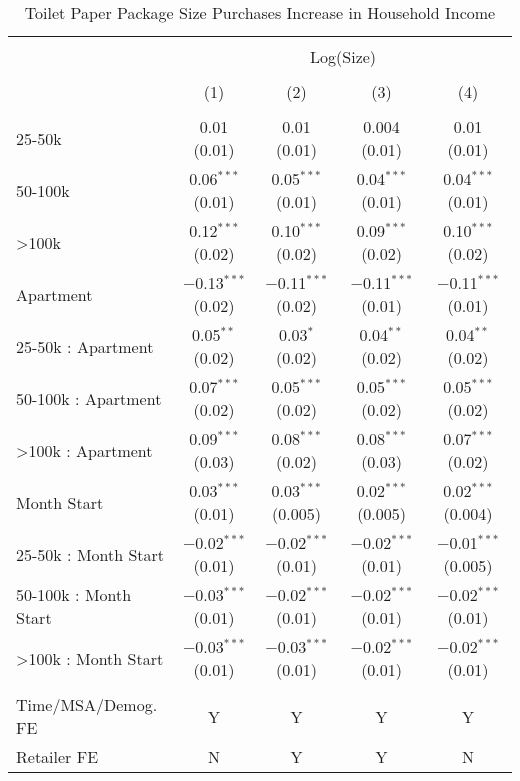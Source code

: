 
\begin{table}[!htbp] \centering 
  \caption{Toilet Paper Package Size Purchases Increase in Household Income} 
  \label{tab:packageSizeFullTP} 
\begin{tabular}{@{\extracolsep{5pt}}lcccc} 
\\[-1.8ex]\hline 
\hline \\[-1.8ex] 
 & \multicolumn{4}{c}{Log(Size)} \\ 
\\[-1.8ex] & (1) & (2) & (3) & (4)\\ 
\hline \\[-1.8ex] 
 25-50k & 0.01 (0.01) & 0.01 (0.01) & 0.004 (0.01) & 0.01 (0.01) \\ 
  50-100k & 0.06$^{***}$ (0.01) & 0.05$^{***}$ (0.01) & 0.04$^{***}$ (0.01) & 0.04$^{***}$ (0.01) \\ 
  >100k & 0.12$^{***}$ (0.02) & 0.10$^{***}$ (0.02) & 0.09$^{***}$ (0.02) & 0.10$^{***}$ (0.02) \\ 
  Apartment & $-$0.13$^{***}$ (0.02) & $-$0.11$^{***}$ (0.02) & $-$0.11$^{***}$ (0.01) & $-$0.11$^{***}$ (0.01) \\ 
  25-50k : Apartment & 0.05$^{**}$ (0.02) & 0.03$^{*}$ (0.02) & 0.04$^{**}$ (0.02) & 0.04$^{**}$ (0.02) \\ 
  50-100k : Apartment & 0.07$^{***}$ (0.02) & 0.05$^{***}$ (0.02) & 0.05$^{***}$ (0.02) & 0.05$^{***}$ (0.02) \\ 
  >100k : Apartment & 0.09$^{***}$ (0.03) & 0.08$^{***}$ (0.02) & 0.08$^{***}$ (0.03) & 0.07$^{***}$ (0.02) \\ 
  Month Start & 0.03$^{***}$ (0.01) & 0.03$^{***}$ (0.005) & 0.02$^{***}$ (0.005) & 0.02$^{***}$ (0.004) \\ 
  25-50k : Month Start & $-$0.02$^{***}$ (0.01) & $-$0.02$^{***}$ (0.01) & $-$0.02$^{***}$ (0.01) & $-$0.01$^{***}$ (0.005) \\ 
  50-100k : Month Start & $-$0.03$^{***}$ (0.01) & $-$0.02$^{***}$ (0.01) & $-$0.02$^{***}$ (0.01) & $-$0.02$^{***}$ (0.01) \\ 
  >100k : Month Start & $-$0.03$^{***}$ (0.01) & $-$0.03$^{***}$ (0.01) & $-$0.02$^{***}$ (0.01) & $-$0.02$^{***}$ (0.01) \\ 
 \hline \\[-1.8ex] 
Time/MSA/Demog. FE & Y & Y & Y & Y \\ 
Retailer FE & N & Y & Y & N \\ 

\end{tabular}
\end{table}
